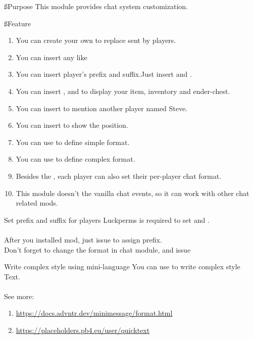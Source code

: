 \ss{Purpose}
This module provides chat system customization.

\ss{Feature}
\begin{enumerate}
    \item You can create your own  to replace  sent by players.
    \item You can insert any  like 
    \item You can insert player's prefix and suffix.Just insert  and .
    \item You can insert ,  and  to display your item, inventory and ender-chest.
    \item You can insert  to mention another player named Steve.
    \item You can insert  to show the position.
    \item You can use  to define simple format.
    \item You can use  to define complex format.
    \item Besides the , each player can also set their per-player chat format.
    \item This module doesn't  the vanilla chat events, so it can work with other chat related mods.
\end{enumerate}

\begin{note}{Set prefix and suffix for players}
    Luckperms is required to set  and .
    \\
    \\
    After you installed  mod, just issue  to assign prefix.
    \\
    Don't forget to change the format in chat module, and issue 
\end{note}

\begin{tips}{Write complex style using mini-language}
    You can use  to write complex style Text.
    \\
    \\
    See more:
    \begin{enumerate}
        \item \url{https://docs.advntr.dev/minimessage/format.html}
        \item \url{https://placeholders.pb4.eu/user/quicktext}
    \end{enumerate}
\end{tips}

